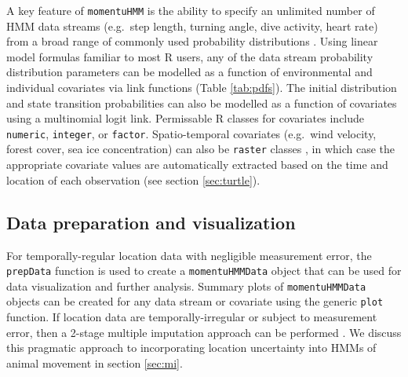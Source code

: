 \documentclass[12pt]{article}\usepackage[]{graphicx}\usepackage[]{color}
\begin{document}
A key feature of \verb|momentuHMM| is the ability to specify an unlimited number of HMM data streams (e.g.\ step length, turning angle, dive activity, heart rate) from a broad range of commonly used probability distributions %
. Using linear model formulas familiar to most R users, any of the data stream probability distribution parameters can be modelled as a function of environmental and individual covariates via link functions (Table \ref{tab:pdfs}). %
The initial distribution %
and state transition probabilities %
can also be modelled as a function of covariates using a multinomial logit link. Permissable R classes for covariates include \verb|numeric|, \verb|integer|, or \verb|factor|. %
Spatio-temporal covariates (e.g.\ wind velocity, forest cover, sea ice concentration) can also be \verb|raster| classes \citep{Hijmans2016}, in which case the appropriate covariate values are automatically extracted based on the time and location of each observation (see section \ref{sec:turtle}).

\subsection{Data preparation and visualization}
For temporally-regular location data with negligible measurement error, the \verb|prepData| function is used to create a \verb|momentuHMMData| object that can be used for data visualization and further analysis. Summary plots of \verb|momentuHMMData| objects can be created for any data stream or covariate using the generic \verb|plot| function. If location data are temporally-irregular or subject to measurement error, then a 2-stage multiple imputation approach can be performed \citep{HootenEtAl2017,McClintock2017}. We discuss this pragmatic approach to incorporating location uncertainty into HMMs of animal movement in section \ref{sec:mi}.
\end{document}
